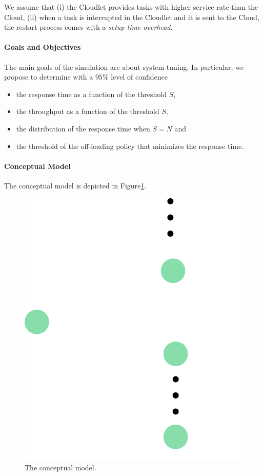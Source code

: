 We assume that
(i) the Cloudlet provides tasks with higher service rate than the Cloud, 
(ii) when a task is interrupted in the Cloudlet and it is sent to the Cloud, the restart process comes with a \textit{setup time overhead}.

\paragraph{Goals and Objectives}
The main goals of the simulation are about system tuning.
In particular, we propose to determine with a $95\%$ level of confidence
\begin{itemize}
	\item the response time as a function of the threshold $S$,
	\item the throughput as a function of the threshold $S$,
	\item the distribution of the response time when $S=N$ and
	\item the threshold of the off-loading policy that minimizes the response time.
\end{itemize}


\paragraph{Conceptual Model}
The conceptual model is depicted in Figure\ref{fig:modeling-conceptual-model}.
\begin{figure}
	\label{fig:modeling-conceptual-model}
	\includegraphics[width=\columnwidth]{fig/modeling-conceptual-model}
	\caption{The conceptual model.}
\end{figure}

